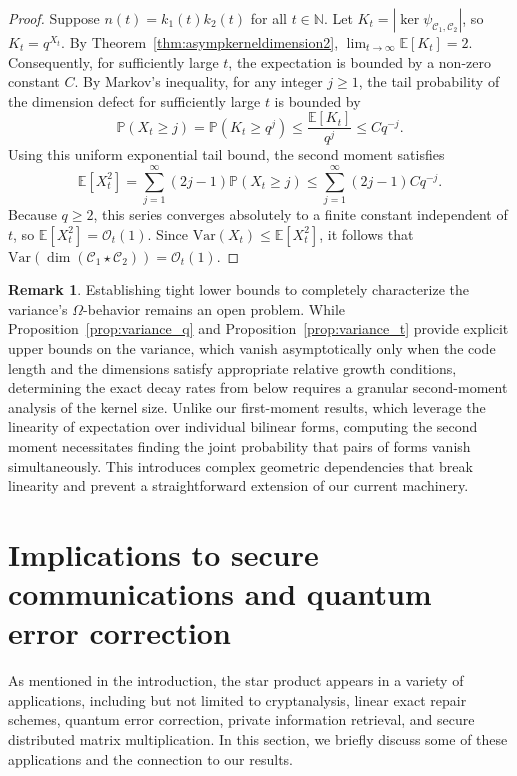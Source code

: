 \documentclass[a4paper,11pt,reqno]{article}
\newcommand{\C}{\mathcal{C}}
\newcommand{\NN}{\mathbb N}
\theoremstyle{plain} \numberwithin{equation}{section}
\theoremstyle{definition}
\newtheorem{remark}[theorem]{Remark}
\begin{document}
{\begin{proof}
    Suppose $n(t) = k_1(t)k_2(t)$ for all $t\in \NN$. Let $K_t = |\ker \psi_{\C_1, \C_2}|$, so $K_t = q^{X_t}$. By Theorem~\ref{thm:asympkerneldimension2}, $\lim_{t \to \infty} \mathbb{E}[K_t] = 2$. Consequently, for sufficiently large $t$, the expectation is bounded by a non-zero constant $C$. By Markov's inequality, for any integer $j \geq 1$, the tail probability of the dimension defect for sufficiently large $t$ is bounded by 
    $$\mathbb{P}(X_t \geq j) = \mathbb{P}(K_t \geq q^j) \leq \frac{\mathbb{E}[K_t]}{q^j} \leq Cq^{-j}.$$
        Using this uniform exponential tail bound, the second moment satisfies 
        $$\mathbb{E}[X_t^2] = \sum_{j=1}^{\infty} (2j-1)\mathbb{P}(X_t \geq j) \leq \sum_{j=1}^{\infty} (2j-1) Cq^{-j}.$$
        Because $q \geq 2$, this series converges absolutely to a finite constant independent of $t$, so $\mathbb{E}[X_t^2] = \mathcal{O}_t(1)$. Since $\mathrm{Var}(X_t) \leq \mathbb{E}[X_t^2]$, it follows that $\mathrm{Var}(\dim(\C_1 \star \C_2)) = \mathcal{O}_t(1)$.
\end{proof}
\begin{remark}
Establishing tight lower bounds to completely characterize the variance's $\Omega$-behavior remains an open problem. While Proposition~\ref{prop:variance_q} and Proposition~\ref{prop:variance_t} provide explicit upper bounds on the variance, which vanish asymptotically only when the code length and the dimensions satisfy appropriate relative growth conditions, determining the exact decay rates from below requires a granular second-moment analysis of the kernel size. Unlike our first-moment results, which leverage the linearity of expectation over individual bilinear forms, computing the second moment necessitates finding the joint probability that pairs of forms vanish simultaneously. This introduces complex geometric dependencies that break linearity and prevent a straightforward extension of our current machinery.
\end{remark}
}

\section{{Implications to secure communications and quantum error correction}}
\label{sec:app}

As mentioned in the introduction, the star product appears in a variety of applications, including but not limited to cryptanalysis, linear exact repair schemes, quantum error correction, private information retrieval, and secure distributed matrix multiplication.  In this section, we briefly discuss some of these applications and the connection to our results.
\end{document}

